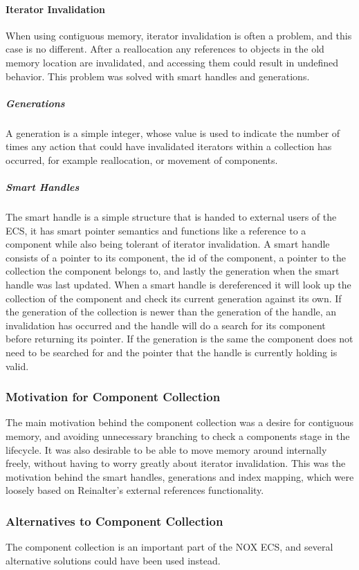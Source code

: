 \paragraph{Iterator Invalidation}
When using contiguous memory, iterator invalidation is often a problem, and this case is no different.
After a reallocation any references to objects in the old memory location are invalidated,
and accessing them could result in undefined behavior.
This problem was solved with smart handles and generations.

\subparagraph{Generations}
A generation is a simple integer, whose value is used to indicate the number of times any action that
could have invalidated iterators within a collection has occurred, for example reallocation,
or movement of components.

\subparagraph{Smart Handles}
The smart handle is a simple structure that is handed to external users of the ECS,
it has smart pointer semantics and functions like a reference to a component while also being tolerant of iterator invalidation.
A smart handle consists of a pointer to its component, the id of the component,
a pointer to the collection the component belongs to, and lastly the generation when the smart handle was last updated.
When a smart handle is dereferenced it will look up the collection of the component and check its current generation
against its own. If the generation of the collection is newer than the generation of the handle,
an invalidation has occurred and the handle will do a search for its component before returning its pointer.
If the generation is the same the component does not need to be searched for and the pointer that the handle is currently holding is valid.

\subsubsection{Motivation for Component Collection}
The main motivation behind the component collection was a desire for contiguous memory, and avoiding unnecessary
branching to check a components stage in the lifecycle.
It was also desirable to be able to move memory around internally freely, without having to worry greatly about
iterator invalidation. This was the motivation behind the smart handles, generations and index mapping, which were loosely based
on Reinalter\cite{molecular_matters_dod_external_references}'s external references functionality.

\subsubsection{Alternatives to Component Collection}
The component collection is an important part of the NOX ECS, and several alternative solutions could have been used instead.

